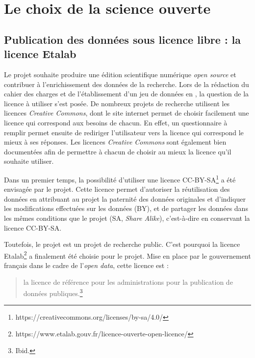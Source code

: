 \section{Le choix de la science ouverte}
    \subsection{Publication des données sous licence libre : la licence Etalab}

Le projet \COREL souhaite produire une édition scientifique numérique \textit{open source} et contribuer à l'enrichissement des données de la recherche. Lors de la rédaction du cahier des charges et de l'établissement d'un jeu de données en \TEI, la question de la licence à utiliser s'est posée. De nombreux projets de recherche utilisent les licences \textit{Creative Commons}, dont le site internet permet de choisir facilement une licence qui correspond aux besoins de chacun. En effet, un questionnaire à remplir permet ensuite de rediriger l'utilisateur vers la licence qui correspond le mieux à ses réponses. Les licences \textit{Creative Commons} sont également bien documentées afin de permettre à chacun de choisir au mieux la licence qu'il souhaite utiliser. 

Dans un premier temps, la possibilité d'utiliser une licence CC-BY-SA\footnote{https://creativecommons.org/licenses/by-sa/4.0/} a été envisagée par le projet. Cette licence permet d'autoriser la réutilisation des données en attribuant au projet \COREL la paternité des données originales et d'indiquer les modifications effectuées sur les données (BY), et de partager les données dans les mêmes conditions que le projet \COREL (SA, \textit{Share Alike}), c'est-à-dire en conservant la licence CC-BY-SA. 

Toutefois, le projet \COREL est un projet de recherche public. C'est pourquoi la licence Etalab\footnote{https://www.etalab.gouv.fr/licence-ouverte-open-licence/} a finalement été choisie pour le projet. Mise en place par le gouvernement français dans le cadre de l'\textit{open data}, cette licence est : 

\begin{quote}
    la licence de référence pour les administrations pour la publication de données publiques.\footnote{Ibid.}
\end{quote}

